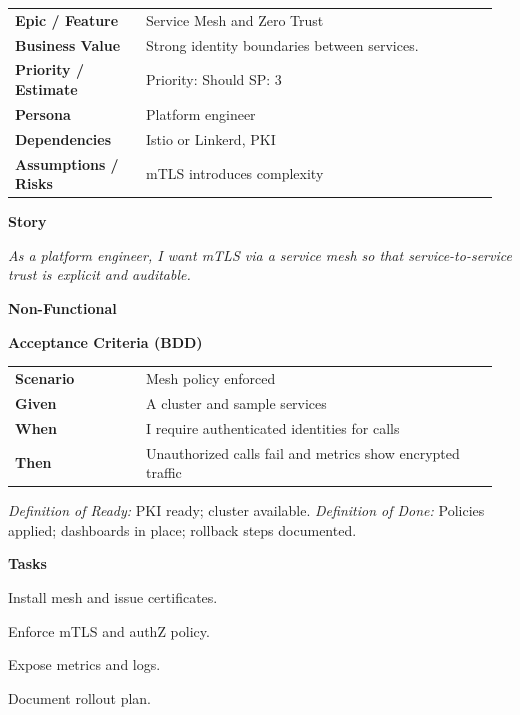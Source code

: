 \documentclass[11pt,letterpaper]{article}
\makeatletter
\newenvironment{kvtable}{%
  \par\noindent\begin{tabular}{@{}>{\raggedright\bfseries\arraybackslash}p{0.26\linewidth} >{\raggedright\arraybackslash}p{0.70\linewidth}@{}}
}{\end{tabular}\par}
\newenvironment{bdd}{%
  \par\noindent\begin{tabular}{@{}>{\raggedright\bfseries\arraybackslash}p{0.26\linewidth} >{\raggedright\arraybackslash}p{0.70\linewidth}@{}}
}{\end{tabular}\par}
\newcommand{\DoRDoD}[2]{%
  \vspace{0.35em}
  {\footnotesize\color{Muted}%
    \textit{Definition of Ready:} #1 \; \textbullet\;
    \textit{Definition of Done:} #2%
  }%
}
\newenvironment{storycard}[2]{%
  \begin{tcolorbox}[cloudcard, title={#1 --- #2}]%
}{\end{tcolorbox}}
\newcommand{\sectionlabel}[1]{\par\vspace{0.35em}\textbf{#1}\par}
\makeatother
\begin{document}
\begin{storycard}{CCS-31}{Ch. 31 — Advanced Security Architecture}
\begin{kvtable}
Epic / Feature & Service Mesh and Zero Trust\\
Business Value & Strong identity boundaries between services.\\
Priority / Estimate & Priority: Should \quad SP: 3\\
Persona & Platform engineer\\
Dependencies & Istio or Linkerd, PKI\\
Assumptions / Risks & mTLS introduces complexity\\
\end{kvtable}
\sectionlabel{Story}
\textit{As a platform engineer, I want mTLS via a service mesh so that service-to-service trust is explicit and auditable.}
\sectionlabel{Non-Functional}\;\;
\sectionlabel{Acceptance Criteria (BDD)}
\begin{bdd}
Scenario & Mesh policy enforced\\
Given & A cluster and sample services\\
When & I require authenticated identities for calls\\
Then & Unauthorized calls fail and metrics show encrypted traffic\\
\end{bdd}
\DoRDoD{PKI ready; cluster available.}{Policies applied; dashboards in place; rollback steps documented.}
\sectionlabel{Tasks}
\begin{checklist}
\item Install mesh and issue certificates.
\item Enforce mTLS and authZ policy.
\item Expose metrics and logs.
\item Document rollout plan.
\end{checklist}
\end{storycard}
\end{document}
